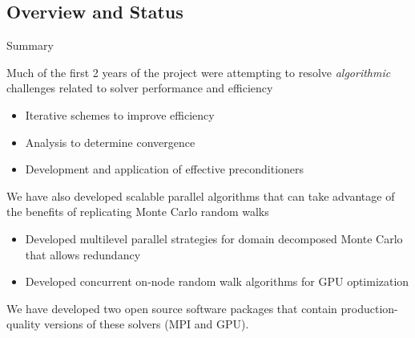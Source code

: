 \documentclass{beamer}
\begin{document}
\subsection{Overview and Status}

\begin{frame}{Summary}

  Much of the first 2 years of the project were attempting to resolve
  \textit{algorithmic} challenges related to solver performance and efficiency
  \begin{itemize}
  \item Iterative schemes to improve efficiency
  \item Analysis to determine convergence
  \item Development and application of effective preconditioners
  \end{itemize}

  \vfill

  We have also developed scalable parallel algorithms that can take advantage
  of the benefits of replicating Monte Carlo random walks
  \begin{itemize}
  \item Developed multilevel parallel strategies for domain decomposed Monte
    Carlo that allows redundancy
  \item Developed concurrent on-node random walk algorithms for GPU
    optimization
  \end{itemize}

  \vfill

  We have developed two open source software packages that contain
  production-quality versions of these solvers (MPI and GPU).

\end{frame}
\end{document}
